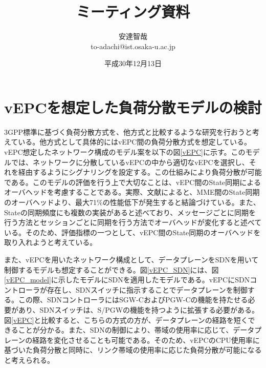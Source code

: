 \documentclass[a4j]{ujarticle}
\title{ミーティング資料}
\author{安達智哉\\to-adachi@ist.osaka-u.ac.jp}
\date{平成30年12月13日}
\begin{document}
\maketitle

\section{vEPCを想定した負荷分散モデルの検討}
3GPP標準に基づく負荷分散方式を、他方式と比較するような研究を行おうと考えている。他方式として具体的にはvEPC間の負荷分散方式を想定している。vEPC想定したネットワーク構成のモデル案を以下の図\ref{vEPC}に示す。このモデルでは、ネットワークに分散しているvEPCの中から適切なvEPCを選択し、それを経由するようにシグナリングを設定する。この仕組みにより負荷分散が可能である。このモデルの評価を行う上で大切なことは、vEPC間のState同期によるオーバヘッドを考慮することである。実際、文献\cite{PerformanceComparisonofStateSynchronizationTechniquesinaDistributedLTEEPC}によると、MME間のState同期のオーバヘッドより、最大71\%の性能低下が発生すると結論づけている。また、Stateの同期頻度にも複数の実装があると述べており、メッセージごとに同期を行う方法とセッションごとに同期を行う方法でオーバヘッドが変化すると述べている。そのため、評価指標の一つとして、vEPC間のState同期のオーバヘッドを取り入れようと考えている。


また、vEPCを用いたネットワーク構成として、データプレーンをSDNを用いて制御するモデルも想定することができる。図\ref{vEPC_SDN}には、図\ref{vEPC_model}に示したモデルにSDNを適用したモデルである。vEPCにSDNコントローラが存在し、SDNスイッチに指示することでデータプレーンを制御する。この際、SDNコントローラにはSGW-CおよびPGW-Cの機能を持たせる必要があり、SDNスイッチは、S/PGWの機能を持つように拡張する必要がある。図\ref{vEPC}と比較すると、こちらの方式の方が、データプレーンの経路を短くできることが分かる。また、SDNの制御により、帯域の使用率に応じて、データプレーンの経路を変化させることも可能である。そのため、vEPCのCPU使用率に基づいた負荷分散と同時に、リンク帯域の使用率に応じた負荷分散が可能になると考えられる。
\end{document}
